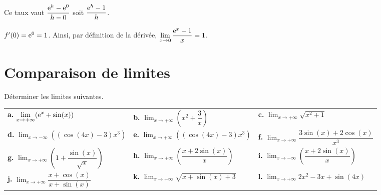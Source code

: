 \documentclass[11pt,fleqn, openany]{book} %
\begin{document}
\begin{solution}Ce taux vaut $\dfrac{\mathrm{e}^h-\mathrm{e}^0}{h-0}$ soit $\dfrac{\mathrm{e}^h-1}{h}$.

$f'(0)=\mathrm{e}^0=1$. Ainsi, par définition de la dérivée, $\displaystyle \lim_{x \to 0} \dfrac{\mathrm{e}^x-1}{x} = 1$.\end{solution}


\section*{Comparaison de limites}

\begin{exercise}[topic=lim23]Déterminer les limites suivantes.

\renewcommand{\arraystretch}{1.5}
\begin{tabularx}{\linewidth}{XXX}
 \textbf{a.} $\displaystyle \lim_{x \to +\infty} (\mathrm{e}^x + \sin(x))$ &
 \textbf{b.} $\displaystyle \lim_{x \to +\infty} \left(x^2+\dfrac{3}{x}\right)$ &
  \textbf{c.} $\displaystyle \lim_{x \to +\infty} \sqrt{x^2+1}$ \\
 \textbf{d.} $\displaystyle \lim_{x \to -\infty} \left((\cos(4x)-3)x^3\right)$ & 
 \textbf{e.} $\displaystyle \lim_{x \to +\infty} \left((\cos(4x)-3)x^3\right)$ &
 \textbf{f.}  $\displaystyle \lim_{x \to +\infty} \dfrac{3\sin(x)+2 \cos(x)}{x^3}$ \\
 \textbf{g.} $\displaystyle \lim_{x \to +\infty} \left(1+\dfrac{\sin (x)}{\sqrt{x}}\right)$ &
  \textbf{h.} $\displaystyle \lim_{x \to +\infty} \left( \dfrac{x+2\sin(x)}{x}\right)$ & 
 \textbf{i.} $\displaystyle \lim_{x \to -\infty} \left(\dfrac{x+2\sin (x)}{x}\right)$ \\
  \textbf{j.} $\displaystyle \lim_{x \to +\infty} \dfrac{x+\cos(x)}{x+\sin(x)}$ &
 \textbf{k.} $\displaystyle \lim_{x \to +\infty}\sqrt{x+\sin(x)+3}$ & 
 \textbf{l.} $\displaystyle \lim_{x \to +\infty}2x^2-3x+\sin(4x)$
\end{tabularx}\end{exercise}
\end{document}

